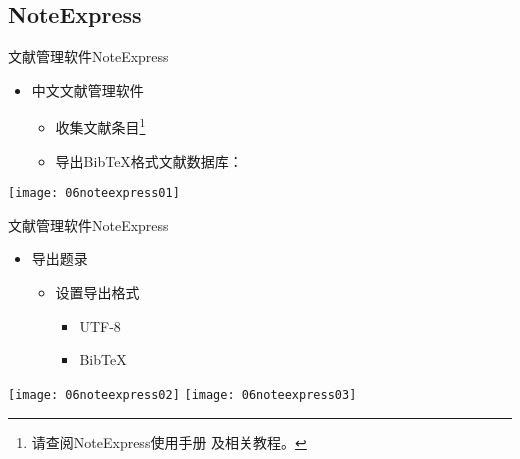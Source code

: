 \documentclass[fontset = none, t]{ctexbeamer}
\begin{document}
\subsection[NoteExpress]{NoteExpress}
\begin{frame}[fragile]{文献管理软件}{NoteExpress}
  \begin{spacing}{1.5}
    \begin{itemize}
    \item 中文文献管理软件
      \begin{itemize}
      \item 收集文献条目\footnote[frame, 2]{请查阅NoteExpress使用手册
          及相关教程。}
      \item 导出Bib\TeX 格式文献数据库：
      \end{itemize}
    \end{itemize}    
    \begin{center}
      \texttt{[image: 06noteexpress01]}
    \end{center}
  \end{spacing}
\end{frame}

\begin{frame}[fragile]{文献管理软件}{NoteExpress}
  \begin{spacing}{1.2}
    \begin{itemize}
    \item 导出题录
      \begin{itemize}
      \item 设置导出格式
        \begin{itemize}
        \item UTF-8
        \item Bib\TeX
        \end{itemize}
      \end{itemize}
    \end{itemize}
    \begin{center}
      \texttt{[image: 06noteexpress02]}
      \texttt{[image: 06noteexpress03]}
    \end{center}
  \end{spacing}
\end{frame}
\end{document}
